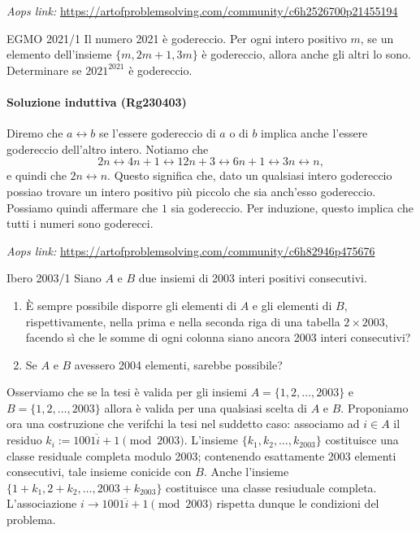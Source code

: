 \documentclass{article}
\begin{document}
\vspace{0.5cm}
\textit{Aops link:}
\href{https://artofproblemsolving.com/community/c6h2526700p21455194}
{https://artofproblemsolving.com/community/c6h2526700p21455194}

\begin{proposition}{EGMO 2021/1}{}
	Il numero 2021 è godereccio. Per ogni intero positivo
	$m$, se un elemento dell'insieme $\{ m,2m+1,3m \}$ è
	godereccio, allora anche gli altri lo sono.
Determinare se $2021^{2021}$ è godereccio.
\end{proposition}

\paragraph{Soluzione induttiva (Rg230403)}
Diremo che $a\leftrightarrow b$ se l'essere godereccio
di $a$ o di $b$ implica anche l'essere godereccio dell'altro intero.
Notiamo che
\begin{equation*}
	2n\leftrightarrow 4n+1
		\leftrightarrow 12n+3
		\leftrightarrow 6n+1
		\leftrightarrow 3n
		\leftrightarrow n,
\end{equation*}
e quindi che $2n\leftrightarrow n$. Questo significa che, dato un qualsiasi
intero godereccio possiao trovare un intero positivo più piccolo che sia
anch'esso godereccio. Possiamo quindi affermare che $1$ sia godereccio.
Per induzione, questo implica che tutti i numeri sono goderecci.

\vspace{0.5cm}
\textit{Aops link:}
\href{https://artofproblemsolving.com/community/c6h82946p475676}
{https://artofproblemsolving.com/community/c6h82946p475676}

\begin{proposition}{Ibero 2003/1}{}
	Siano $A$ e $B$ due insiemi di
	2003 interi positivi consecutivi.
	\begin{enumerate}
		\item È sempre possibile disporre gli elementi di $A$ e gli
			elementi di $B$, rispettivamente, nella prima e nella seconda
			riga di una tabella $2\times 2003$, facendo sì che le
			somme di ogni colonna siano ancora 2003 interi consecutivi?
		\item Se $A$ e $B$ avessero 2004 elementi, sarebbe possibile?
	\end{enumerate}
\end{proposition}

Osserviamo che se la tesi è valida per gli insiemi
$A=\{1,2,\dots,2003\}$ e $B=\{1,2,\dots,2003\}$ allora
è valida per una qualsiasi scelta di $A$ e $B$. Proponiamo ora una
costruzione che verifchi la tesi nel suddetto caso: associamo ad $i\in A$
il residuo $k_i:=\overline{1001i+1} \pmod{2003}$.
L'insieme $\{k_1,k_2,\dots,k_{2003}\}$ costituisce una classe residuale
completa modulo 2003; contenendo esattamente 2003 elementi consecutivi,
tale insieme conicide con $B$. Anche l'insieme
$\{1+k_1,2+k_2,\dots,2003+k_{2003}\}$ costituisce una classe resiuduale
completa. L'associazione $i\to \overline{1001i+1} \pmod{2003}$
rispetta dunque le condizioni del problema.
\end{document}
